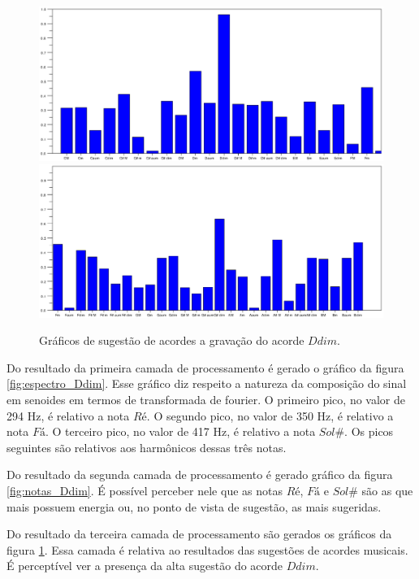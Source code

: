 \begin{figure}[h]
	\centering
		\includegraphics[keepaspectratio=true,scale=0.49]{figuras/Dm/acordes_1_Ddim.eps}
		\includegraphics[keepaspectratio=true,scale=0.49]{figuras/Dm/acordes_2_Ddim.eps}
	\caption{Gráficos de sugestão de acordes a gravação do acorde $Ddim$.}
  \label{fig:acordes_Ddim}
\end{figure}
\newpage

Do resultado da primeira camada de processamento é gerado o gráfico da figura \ref{fig:espectro_Ddim}. Esse gráfico diz respeito a natureza da composição do sinal em senoides em termos de transformada de fourier. O primeiro pico, no valor de 294 Hz, é relativo a nota $Ré$. O segundo pico, no valor de 350 Hz, é relativo a nota $Fá$. O terceiro pico, no valor de 417 Hz, é relativo a nota $Sol\#$. Os picos seguintes são relativos aos harmônicos dessas três notas.

Do resultado da segunda camada de processamento é gerado gráfico da figura \ref{fig:notas_Ddim}. É possível perceber nele que as notas $Ré$, $Fá$ e $Sol\#$ são as que mais possuem energia ou, no ponto de vista de sugestão, as mais sugeridas.

Do resultado da terceira camada de processamento são gerados os gráficos da figura \ref{fig:acordes_Ddim}. Essa camada é relativa ao resultados das sugestões de acordes musicais. É perceptível ver a presença da alta sugestão do acorde $Ddim$.

